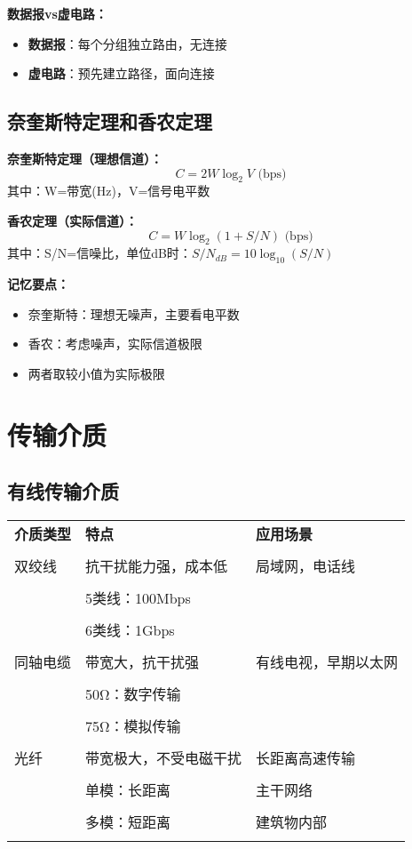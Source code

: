 \documentclass[lang=cn,newtx,10pt,scheme=chinese]{../../elegantbook}
\begin{document}
\textbf{数据报vs虚电路：}
\begin{itemize}
  \item \textbf{数据报}：每个分组独立路由，无连接
  \item \textbf{虚电路}：预先建立路径，面向连接
\end{itemize}

\subsection{奈奎斯特定理和香农定理}

\textbf{奈奎斯特定理（理想信道）：}
\[
C = 2W \log_2 V \text{ (bps)}
\]
其中：W=带宽(Hz)，V=信号电平数

\textbf{香农定理（实际信道）：}
\[
C = W \log_2(1 + S/N) \text{ (bps)}
\]
其中：S/N=信噪比，单位dB时：$S/N_{dB} = 10\log_{10}(S/N)$

\textbf{记忆要点：}
\begin{itemize}
  \item 奈奎斯特：理想无噪声，主要看电平数
  \item 香农：考虑噪声，实际信道极限
  \item 两者取较小值为实际极限
\end{itemize}

\section{传输介质}

\subsection{有线传输介质}

\begin{longtable}{@{}p{2.5cm}p{4cm}p{6cm}@{}}
\toprule
\textbf{介质类型} & \textbf{特点} & \textbf{应用场景} \\\\ \midrule
\endhead

双绞线 & 抗干扰能力强，成本低 & 局域网，电话线 \\\\
& 5类线：100Mbps & \\\\
& 6类线：1Gbps & \\\\
\hline

同轴电缆 & 带宽大，抗干扰强 & 有线电视，早期以太网 \\\\
& 50Ω：数字传输 & \\\\
& 75Ω：模拟传输 & \\\\
\hline

光纤 & 带宽极大，不受电磁干扰 & 长距离高速传输 \\\\
& 单模：长距离 & 主干网络 \\\\
& 多模：短距离 & 建筑物内部 \\\\

\bottomrule
\end{longtable}
\end{document}
